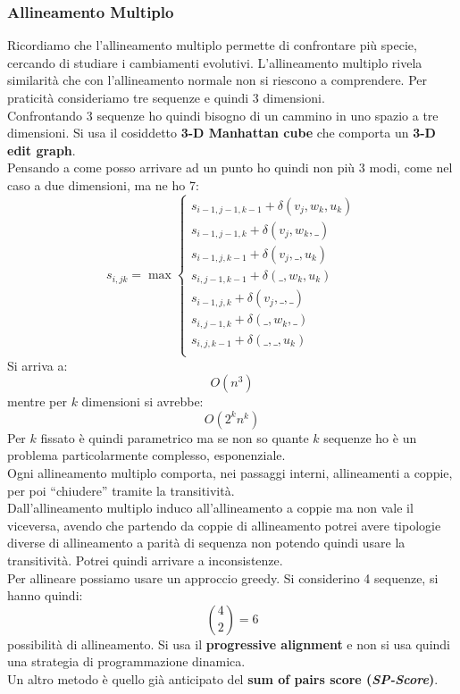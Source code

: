 \documentclass[a4paper,12pt, oneside]{book}
\begin{document}
\subsubsection{Allineamento Multiplo}
Ricordiamo che l'allineamento multiplo permette di confrontare più specie,
cercando di studiare i cambiamenti evolutivi. L'allineamento multiplo rivela
similarità che con l'allineamento normale non si riescono a comprendere. 
Per praticità consideriamo tre sequenze e quindi 3 dimensioni.\\
Confrontando 3 sequenze ho quindi bisogno di un cammino in uno spazio a tre
dimensioni. Si usa il cosiddetto \textbf{3-D Manhattan cube} che comporta un
\textbf{3-D edit graph}.\\
Pensando a come posso arrivare ad un punto ho quindi non più 3 modi, come nel
caso a due dimensioni, ma ne ho 7:
\[s_{i,jk}=\max
  \begin{cases}
    s_{i-1,j-1,k-1}+\delta(v_j,w_k,u_k)\\
    s_{i-1,j-1,k}+\delta(v_j,w_k,\_)\\
    s_{i-1,j,k-1}+\delta(v_j,\_,u_k)\\
    s_{i,j-1,k-1}+\delta(\_,w_k,u_k)\\
    s_{i-1,j,k}+\delta(v_j,\_,\_)\\
    s_{i,j-1,k}+\delta(\_,w_k,\_)\\
    s_{i,j,k-1}+\delta(\_,\_,u_k)\\  
  \end{cases}
\]
Si arriva a:
\[O(n^3)\]
mentre per $k$ dimensioni si avrebbe:
\[O(2^kn^k)\]
Per $k$ fissato è quindi parametrico ma se non so quante $k$ sequenze ho è un
problema particolarmente complesso, esponenziale. \\
Ogni allineamento multiplo comporta, nei passaggi interni, allineamenti a
coppie, per poi ``chiudere'' tramite la transitività.\\
Dall'allineamento multiplo induco all'allineamento a coppie ma non vale il
viceversa, avendo che partendo da coppie di allineamento potrei avere tipologie
diverse di allineamento a parità di sequenza non potendo quindi usare la
transitività. Potrei quindi arrivare a inconsistenze.\\
Per allineare possiamo usare un approccio greedy. Si considerino 4 sequenze, si
hanno quindi:
\[{{4}\choose {2}}=6\]
possibilità di allineamento. Si usa il \textbf{progressive alignment} e non si
usa quindi una strategia di programmazione dinamica.\\
Un altro metodo è quello già anticipato del \textbf{sum of pairs score
  (\textit{SP-Score})}. \\
\end{document}
